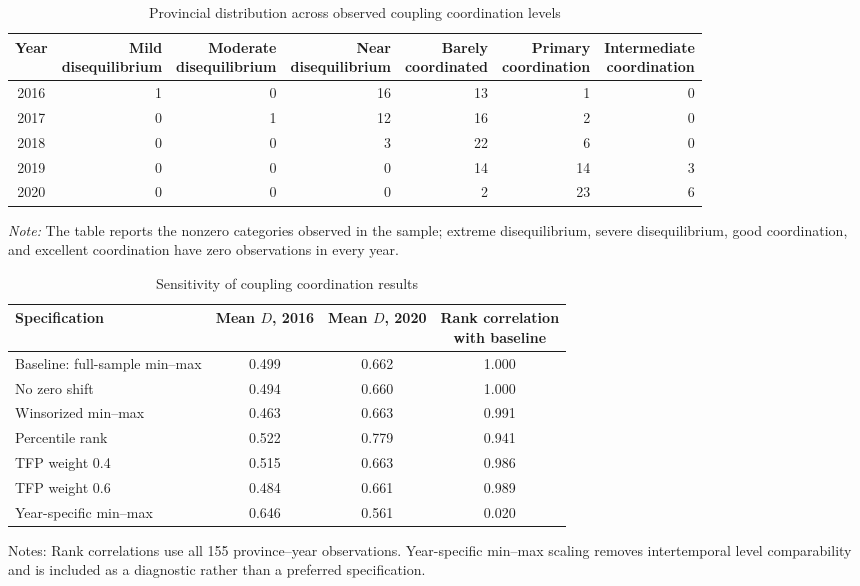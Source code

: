 \documentclass[sustainability,article,submit,moreauthors]{Definitions/mdpi}
\numberwithin{equation}{section}
\begin{document}
\begin{table}[H]
\centering
\caption{Provincial distribution across observed coupling coordination levels}
\label{tab:ccdlevels}
\footnotesize
\begin{tabular}{c rrrrrr}
\toprule
Year & \shortstack{Mild\\disequilibrium} & \shortstack{Moderate\\disequilibrium} & \shortstack{Near\\disequilibrium} & \shortstack{Barely\\coordinated} & \shortstack{Primary\\coordination} & \shortstack{Intermediate\\coordination} \\
\midrule
2016 & 1 & 0 & 16 & 13 & 1 & 0 \\
2017 & 0 & 1 & 12 & 16 & 2 & 0 \\
2018 & 0 & 0 & 3 & 22 & 6 & 0 \\
2019 & 0 & 0 & 0 & 14 & 14 & 3 \\
2020 & 0 & 0 & 0 & 2 & 23 & 6 \\
\bottomrule
\end{tabular}
\parbox{0.94\textwidth}{\footnotesize\textit{Note:} The table reports the nonzero categories observed in the sample; extreme disequilibrium, severe disequilibrium, good coordination, and excellent coordination have zero observations in every year.}
\end{table}

\begin{table}[H]
\centering
\caption{Sensitivity of coupling coordination results}
\label{tab:ccdsensitivity}
\footnotesize
\begin{threeparttable}
\begin{tabular}{lccc}
\toprule
Specification & Mean $D$, 2016 & Mean $D$, 2020 & \shortstack{Rank correlation\\with baseline} \\
\midrule
Baseline: full-sample min--max & 0.499 & 0.662 & 1.000 \\
No zero shift & 0.494 & 0.660 & 1.000 \\
Winsorized min--max & 0.463 & 0.663 & 0.991 \\
Percentile rank & 0.522 & 0.779 & 0.941 \\
TFP weight 0.4 & 0.515 & 0.663 & 0.986 \\
TFP weight 0.6 & 0.484 & 0.661 & 0.989 \\
Year-specific min--max & 0.646 & 0.561 & 0.020 \\
\bottomrule
\end{tabular}
\begin{tablenotes}[flushleft]\footnotesize
\item Notes: Rank correlations use all 155 province--year observations. Year-specific min--max scaling removes intertemporal level comparability and is included as a diagnostic rather than a preferred specification.
\end{tablenotes}
\end{threeparttable}
\end{table}
\end{document}
